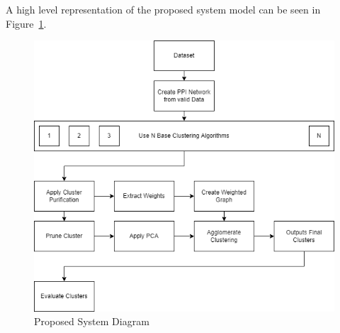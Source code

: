 A high level representation of the proposed system model can be seen in Figure~\ref{fig: systemdiag}.
\begin{figure}[h!]
    \centering
\includegraphics[scale=0.7]{Final-Report-Kavish-1/system_diagram (1).png}
\caption{Proposed System Diagram}
\label{fig: systemdiag}
\end{figure}


